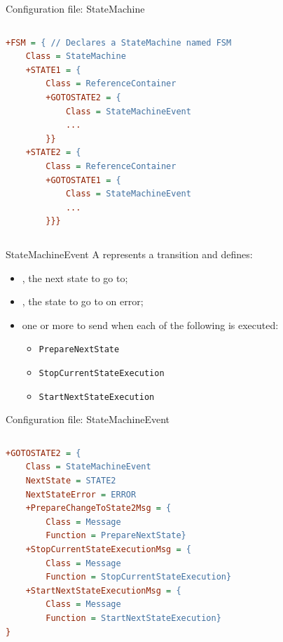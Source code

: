 \begin{frame}[fragile]{Configuration file: StateMachine}
	\begin{columns}
		\begin{lstlisting}[style=normal, language=cfg, caption=StateMachine high-level configuration structure (brackets due to space constraints).]
+FSM = { // Declares a StateMachine named FSM
    Class = StateMachine
    +STATE1 = {
        Class = ReferenceContainer
        +GOTOSTATE2 = {
            Class = StateMachineEvent
            ...
        }}
    +STATE2 = {
        Class = ReferenceContainer
        +GOTOSTATE1 = {
            Class = StateMachineEvent
            ...
        }}}\end{lstlisting}
	\end{columns}
\end{frame}

\begin{frame}{StateMachineEvent}
	A  represents a transition and defines:
	\begin{itemize}
		\item {}, the next state to go to;
		\item {}, the state to go to on error;
		\item one or more  to send when each of the following is executed:
		      \begin{itemize}
			      \item \texttt{PrepareNextState}
			      \item \texttt{StopCurrentStateExecution}
			      \item \texttt{StartNextStateExecution}
		      \end{itemize}
	\end{itemize}
\end{frame}

\begin{frame}[fragile]{Configuration file: StateMachineEvent}
	\begin{columns}
		\begin{lstlisting}[style=normal, language=cfg, caption=StateMachineEvent configuration structure (brackets due to space constraints).]
+GOTOSTATE2 = {
    Class = StateMachineEvent
    NextState = STATE2
    NextStateError = ERROR
    +PrepareChangeToState2Msg = {
        Class = Message
        Function = PrepareNextState}
    +StopCurrentStateExecutionMsg = {
        Class = Message
        Function = StopCurrentStateExecution}
    +StartNextStateExecutionMsg = {
        Class = Message
        Function = StartNextStateExecution}
}\end{lstlisting}
	\end{columns}
\end{frame}
